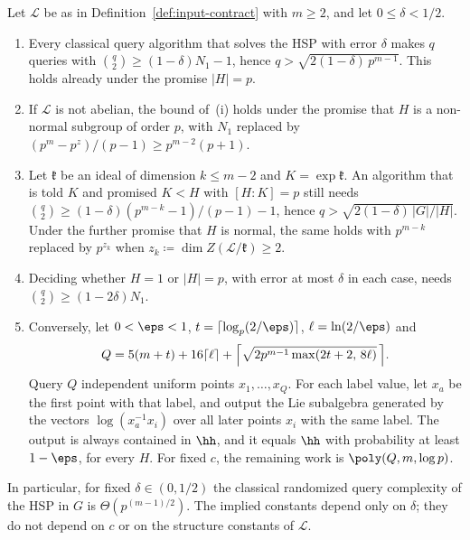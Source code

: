 \begin{proposition}
\label{prop:classical-query}
Let $\mathcal{L}$ be as in Definition~\ref{def:input-contract} with $m \ge 2$, and let $0 \le \delta < 1/2$.
\begin{enumerate}[label=(\roman*),leftmargin=2em]
  \item Every classical query algorithm that solves the HSP with error $\delta$ makes $q$ queries with $\binom q2 \ge (1-\delta)N_1 - 1$, hence $q > \sqrt{2(1-\delta)\,p^{m-1}}$. This holds already under the promise $|H| = p$.
  \item If $\mathcal{L}$ is not abelian, the bound of~(i) holds under the promise that $H$ is a non-normal subgroup of order $p$, with $N_1$ replaced by $(p^m-p^z)/(p-1) \ge p^{m-2}(p+1)$.
  \item Let $\mathfrak{k}$ be an ideal of dimension $k \le m-2$ and $K = \exp\mathfrak{k}$. An algorithm that is told $K$ and promised $K < H$ with $[H:K] = p$ still needs $\binom q2 \ge (1-\delta)(p^{m-k}-1)/(p-1) - 1$, hence $q > \sqrt{2(1-\delta)\,|G|/|H|}$. Under the further promise that $H$ is normal, the same holds with $p^{m-k}$ replaced by $p^{z_k}$ when $z_k \coloneqq \dim Z(\mathcal{L}/\mathfrak{k}) \ge 2$.
  \item Deciding whether $H = 1$ or $|H| = p$, with error at most $\delta$ in each case, needs $\binom q2 \ge (1-2\delta)N_1$.
  \item Conversely, let $0<\eps<1$, $t = \lceil\log_p(2/\eps)\rceil$, $\ell = \ln(2/\eps)$ and
  \[
    Q = 5(m+t) + 16\lceil \ell\rceil + \Bigl\lceil\sqrt{2p^{m-1}\max(2t+2,\,8\ell)}\,\Bigr\rceil .
  \]
  Query $Q$ independent uniform points $x_1,\dots,x_Q$. For each label value, let $x_a$ be the first point with that label, and output the Lie subalgebra generated by the vectors $\log(x_a^{-1}x_i)$ over all later points $x_i$ with the same label. The output is always contained in $\hh$, and it equals $\hh$ with probability at least $1-\eps$, for every $H$. For fixed $c$, the remaining work is $\poly(Q, m, \log p)$.
\end{enumerate}
In particular, for fixed $\delta \in (0,1/2)$ the classical randomized query complexity of the HSP in $G$ is $\Theta(p^{(m-1)/2})$. The implied constants depend only on $\delta$; they do not depend on $c$ or on the structure constants of $\mathcal{L}$.
\end{proposition}

